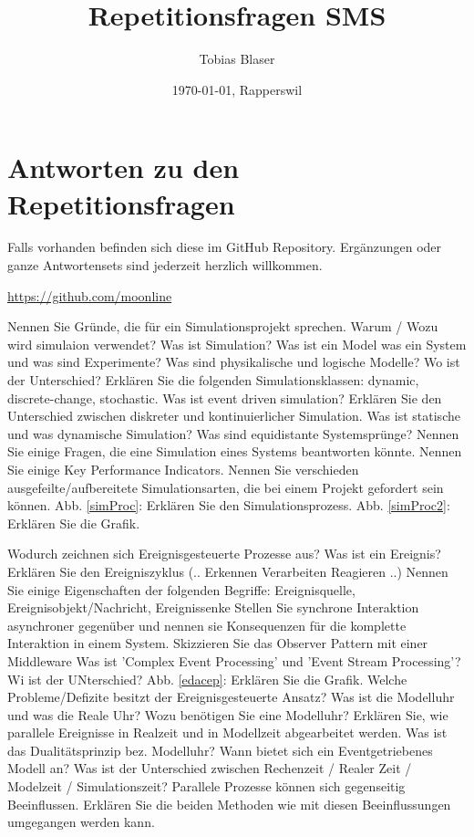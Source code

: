 \documentclass[ngerman,a4paper,12pt]{scrreprt}
\title{Repetitionsfragen SMS}
\author{Tobias Blaser}
\date{\today{}, Rapperswil}
\begin{document}
\tableofcontents

\vspace{1cm}
\section*{Antworten zu den Repetitionsfragen}
Falls vorhanden befinden sich diese im GitHub Repository. Ergänzungen oder ganze Antwortensets sind jederzeit herzlich willkommen.

\noindent\url{https://github.com/moonline}
\clearpage

\ol
	\li Nennen Sie Gründe, die für ein Simulationsprojekt sprechen.
	\li Warum / Wozu wird simulaion verwendet?
	\li Was ist Simulation?
	\li Was ist ein Model was ein System und was sind Experimente?
	\li Was sind physikalische und logische Modelle? Wo ist der Unterschied?
	\li Erklären Sie die folgenden Simulationsklassen: dynamic, discrete-change, stochastic.
	\li Was ist event driven simulation?
	\li Erklären Sie den Unterschied zwischen diskreter und kontinuierlicher Simulation.
	\li Was ist statische und was dynamische Simulation?
	\li Was sind equidistante Systemsprünge?
	\li Nennen Sie einige Fragen, die eine Simulation eines Systems beantworten könnte.
	\li Nennen Sie einige Key Performance Indicators.
	\li Nennen Sie verschieden ausgefeilte/aufbereitete Simulationsarten, die bei einem Projekt gefordert sein können.
	\li Abb. \ref{simProc}: Erklären Sie den Simulationsprozess.
	\li Abb. \ref{simProc2}: Erklären Sie die Grafik.
\olS


\olR
	\li Wodurch zeichnen sich Ereignisgesteuerte Prozesse aus?
	\li Was ist ein Ereignis?
	\li Erklären Sie den Ereigniszyklus (.. \ra Erkennen \ra Verarbeiten \ra Reagieren \ra ..)
	\li Nennen Sie einige Eigenschaften der folgenden Begriffe: Ereignisquelle, Ereignisobjekt/Nachricht, Ereignissenke
	\li Stellen Sie synchrone Interaktion asynchroner gegenüber und nennen sie Konsequenzen für die komplette Interaktion in einem System.
	\li Skizzieren Sie das Observer Pattern mit einer Middleware
	\li Was ist 'Complex Event Processing' und 'Event Stream Processing'? Wi ist der UNterschied?
	\li Abb. \ref{edacep}: Erklären Sie die Grafik.
	\li Welche Probleme/Defizite besitzt der Ereignisgesteuerte Ansatz?
	\li Was ist die Modelluhr und was die Reale Uhr? Wozu benötigen Sie eine Modelluhr?
	\li Erklären Sie, wie parallele Ereignisse in Realzeit und in Modellzeit abgearbeitet werden.
	\li Was ist das Dualitätsprinzip bez. Modelluhr?
	\li Wann bietet sich ein Eventgetriebenes Modell an?
	\li Was ist der Unterschied zwischen Rechenzeit / Realer Zeit / Modelzeit / Simulationszeit?
	\li Parallele Prozesse können sich gegenseitig Beeinflussen. Erklären Sie die beiden Methoden wie mit diesen Beeinflussungen umgegangen werden kann.
\olS
\end{document}
